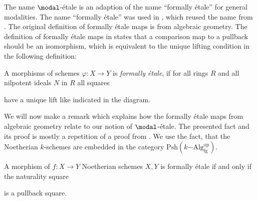 \documentclass{msc}
\begin{document}
The name $\modal$-étale is an adaption of the name ``formally étale'' for general modalities.
The name ``formally étale'' was used in \cite{wellen-thesis}, which reused the name from \cite{SyntheticPDEs}.
The original definition of formally étale maps is from algebraic geometry.
The definition of formally étale maps in \cite[§ 17]{GrothendieckDieudonne} states that a comparison map to a pullback should be an isomorphism,
which is equivalent to the unique lifting condition in the following definition:
\begin{defn}
  A morphisms of schemes $\varphi:X\to Y$ is \emph{formally étale},
  if for all rings $R$ and all nilpotent ideals $N$ in $R$ all squares
  \begin{center}
  \end{center}
  have a unique lift like indicated in the diagram.
\end{defn}
We will now make a remark which explains how the formally étale maps from algebraic geometry relate to our notion of $\modal$-étale.
The presented fact and its proof is mostly a repetition of a proof from \cite[Section 4.4]{wellen-thesis}.
We use the fact, that the Noetherian $k$-schemes are embedded in the category $\mathrm{Psh}(k\mathrm{-Alg}^\mathrm{op}_{\mathrm{fg}})$.
\begin{prp}
  A morphism of $f:X\to Y$ Noetherian schemes $X,Y$ is formally étale if and only if the naturality square
  \begin{center}
  \end{center}
  is a pullback square.
\end{prp}
\end{document}
